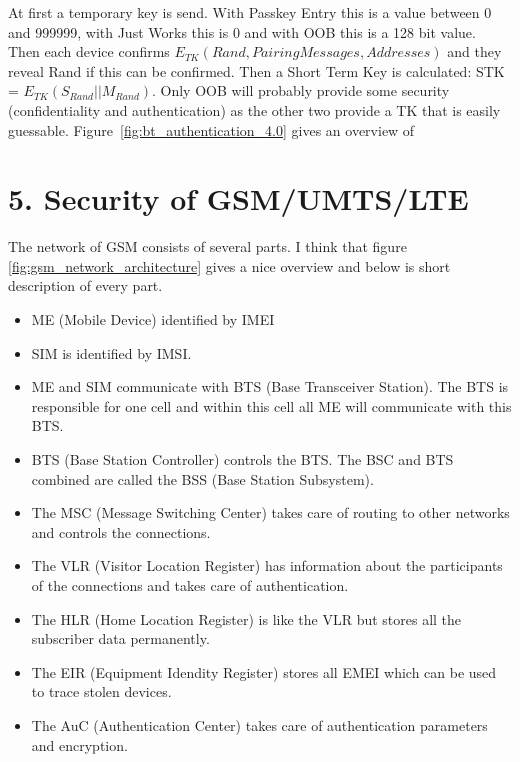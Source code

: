 \documentclass{article}
\begin{document}
At first a temporary key is send. With Passkey Entry this is a value between 0 and 999999, with Just Works this is 0 and with OOB this is a 128 bit value. Then each device confirms $E_{TK}(Rand, PairingMessages, Addresses)$ and they reveal Rand if this can be confirmed. Then a Short Term Key is calculated: STK = $E_{TK}(S_{Rand} || M_{Rand})$. Only OOB will probably provide some security (confidentiality and authentication) as the other two provide a TK that is easily guessable. Figure~\ref{fig:bt_authentication_4.0} gives an overview of 

\section*{5. Security of GSM/UMTS/LTE}
The network of GSM consists of several parts. I think that figure \ref{fig:gsm_network_architecture} gives a nice overview and below is short description of every part.

\begin{itemize}
\item ME (Mobile Device) identified by IMEI
\item SIM is identified by IMSI.
\item ME and SIM communicate with BTS (Base Transceiver Station). The BTS is responsible for one cell and within this cell all ME will communicate with this BTS.
\item BTS (Base Station Controller) controls the BTS. The BSC and BTS combined are called the BSS (Base Station Subsystem).
\item The MSC (Message Switching Center) takes care of routing to other networks and controls the connections.
\item The VLR (Visitor Location Register) has information about the participants of the connections and takes care of authentication.
\item The HLR (Home Location Register) is like the VLR but stores all the subscriber data permanently.
\item The EIR (Equipment Idendity Register) stores all EMEI which can be used to trace stolen devices.
\item The AuC (Authentication Center) takes care of authentication parameters and encryption.
\end{itemize}
\end{document}

